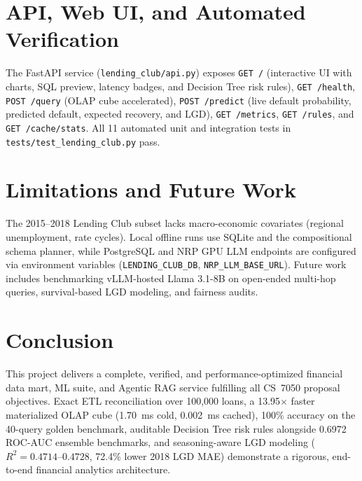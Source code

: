 \documentclass[conference]{IEEEtran}
\begin{document}
\section{API, Web UI, and Automated Verification}
The FastAPI service (\texttt{lending\_club/api.py}) exposes \texttt{GET /} (interactive UI with charts, SQL preview, latency badges, and Decision Tree risk rules), \texttt{GET /health}, \texttt{POST /query} (OLAP cube accelerated), \texttt{POST /predict} (live default probability, predicted default, expected recovery, and LGD), \texttt{GET /metrics}, \texttt{GET /rules}, and \texttt{GET /cache/stats}. All 11 automated unit and integration tests in \texttt{tests/test\_lending\_club.py} pass.

\section{Limitations and Future Work}
The 2015--2018 Lending Club subset lacks macro-economic covariates (regional unemployment, rate cycles). Local offline runs use SQLite and the compositional schema planner, while PostgreSQL \cite{postgres} and NRP GPU LLM endpoints are configured via environment variables (\texttt{LENDING\_CLUB\_DB}, \texttt{NRP\_LLM\_BASE\_URL}). Future work includes benchmarking vLLM-hosted Llama 3.1-8B on open-ended multi-hop queries, survival-based LGD modeling, and fairness audits.

\section{Conclusion}
This project delivers a complete, verified, and performance-optimized financial data mart, ML suite, and Agentic RAG service fulfilling all CS~7050 proposal objectives. Exact ETL reconciliation over 100,000 loans, a 13.95$\times$ faster materialized OLAP cube (1.70~ms cold, 0.002~ms cached), 100\% accuracy on the 40-query golden benchmark, auditable Decision Tree risk rules alongside 0.6972 ROC-AUC ensemble benchmarks, and seasoning-aware LGD modeling ($R^2=0.4714$--$0.4728$, 72.4\% lower 2018 LGD MAE) demonstrate a rigorous, end-to-end financial analytics architecture.
\end{document}

